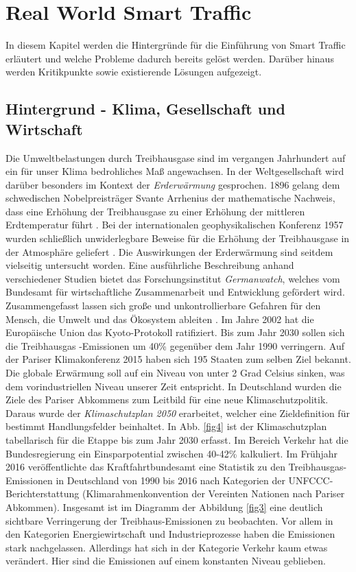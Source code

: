\section{Real World Smart Traffic}
In diesem Kapitel werden die Hintergründe für die Einführung von Smart Traffic erläutert und welche Probleme dadurch bereits gelöst werden. Darüber hinaus werden Kritikpunkte sowie existierende Lösungen aufgezeigt.

\subsection{Hintergrund -  Klima, Gesellschaft und Wirtschaft}

Die Umweltbelastungen durch Treibhausgase sind im vergangen Jahrhundert auf ein für unser Klima bedrohliches Maß angewachsen. In der Weltgesellschaft wird darüber besonders im Kontext der \emph{Erderwärmung} gesprochen. 1896 gelang dem schwedischen Nobelpreisträger Svante Arrhenius der mathematische Nachweis, dass eine Erhöhung der Treibhausgase zu einer Erhöhung der mittleren Erdtemperatur führt \citep[vgl.][]{SvanteArrhenius.1896}. Bei der internationalen geophysikalischen Konferenz 1957 wurden schließlich unwiderlegbare Beweise für die Erhöhung der Treibhausgase in der Atmosphäre geliefert \citep[vgl.][]{Rahmstorf.2007}. Die Auswirkungen der Erderwärmung sind seitdem vielseitig untersucht worden. Eine ausführliche Beschreibung anhand verschiedener Studien bietet das Forschungsinstitut \emph{Germanwatch}, welches vom Bundesamt für wirtschaftliche Zusammenarbeit und Entwicklung gefördert wird. Zusammengefasst lassen sich große und unkontrollierbare Gefahren für den Mensch, die Umwelt und das Ökosystem ableiten \citep{Rothenbucher.2011,Eis.2010}. Im Jahre 2002 hat die Europäische Union das Kyoto-Protokoll ratifiziert. Bis zum Jahr 2030 sollen sich die Treibhausgas -Emissionen um 40\% gegenüber dem Jahr 1990 verringern. Auf der Pariser Klimakonferenz 2015 haben sich 195 Staaten zum selben Ziel bekannt. Die globale Erwärmung soll auf ein Niveau von unter 2 Grad Celsius sinken, was dem vorindustriellen Niveau unserer Zeit entspricht. In Deutschland wurden die Ziele des Pariser Abkommens zum Leitbild für eine neue Klimaschutzpolitik. Daraus wurde der \emph{Klimaschutzplan 2050} erarbeitet, welcher eine Zieldefinition für bestimmt Handlungsfelder beinhaltet. In Abb. \ref{fig4} ist der Klimaschutzplan tabellarisch für die Etappe bis zum Jahr 2030 erfasst. Im Bereich Verkehr hat die Bundesregierung ein Einsparpotential zwischen 40-42\% kalkuliert. Im Frühjahr 2016 veröffentlichte das Kraftfahrtbundesamt eine Statistik zu den Treibhausgas-Emissionen in Deutschland von 1990 bis 2016 nach Kategorien der UNFCCC-Berichterstattung (Klimarahmenkonvention der Vereinten Nationen nach Pariser Abkommen). Insgesamt ist im Diagramm der Abbildung \ref{fig3} eine deutlich sichtbare Verringerung der Treibhaus-Emissionen zu beobachten. Vor allem in den Kategorien Energiewirtschaft und Industrieprozesse haben die Emissionen stark nachgelassen. Allerdings hat sich in der Kategorie Verkehr  kaum etwas verändert. Hier sind die Emissionen auf einem konstanten Niveau geblieben. 

